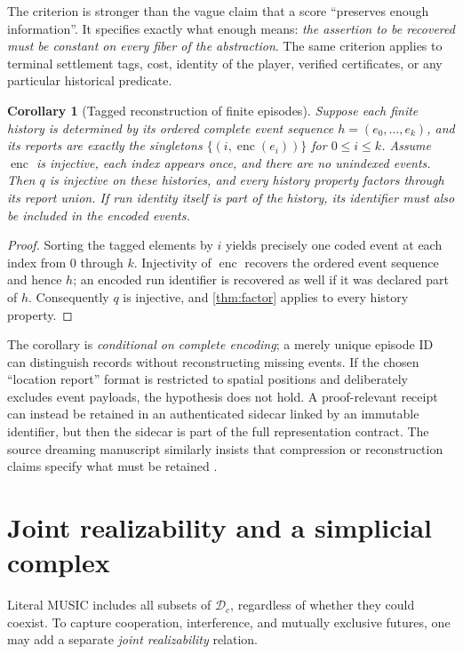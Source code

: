 \documentclass[11pt,letterpaper]{article}
\newtheorem{corollary}[theorem]{Corollary}
\theoremstyle{definition}
\theoremstyle{remark}
\newcommand{\Dream}{\mathcal{D}}
\begin{document}
The criterion is stronger than the vague claim that a score ``preserves enough information''. It specifies exactly what enough means: \emph{the assertion to be recovered must be constant on every fiber of the abstraction}. The same criterion applies to terminal settlement tags, cost, identity of the player, verified certificates, or any particular historical predicate.

\begin{corollary}[Tagged reconstruction of finite episodes]\label{cor:tag}
Suppose each finite history is determined by its ordered complete event sequence $h=(e_0,\ldots,e_k)$, and its reports are \emph{exactly} the singletons $\{(i,\operatorname{enc}(e_i))\}$ for $0\le i\le k$. Assume $\operatorname{enc}$ is injective, each index appears once, and there are no unindexed events. Then $q$ is injective on these histories, and every history property factors through its report union. If run identity itself is part of the history, its identifier must also be included in the encoded events.
\end{corollary}
\begin{proof}
Sorting the tagged elements by $i$ yields precisely one coded event at each index from $0$ through $k$. Injectivity of $\operatorname{enc}$ recovers the ordered event sequence and hence $h$; an encoded run identifier is recovered as well if it was declared part of $h$. Consequently $q$ is injective, and \cref{thm:factor} applies to every history property.
\end{proof}

The corollary is \emph{conditional on complete encoding}; a merely unique episode ID can distinguish records without reconstructing missing events. If the chosen ``location report'' format is restricted to spatial positions and deliberately excludes event payloads, the hypothesis does not hold. A proof-relevant receipt can instead be retained in an authenticated sidecar linked by an immutable identifier, but then the sidecar is part of the full representation contract. The source dreaming manuscript similarly insists that compression or reconstruction claims specify what must be retained \cite{tenneson-dreaming}.

\section{Joint realizability and a simplicial complex}
Literal MUSIC includes all subsets of $\Dream_c$, regardless of whether they could coexist. To capture cooperation, interference, and mutually exclusive futures, one may add a separate \emph{joint realizability} relation.
\end{document}
